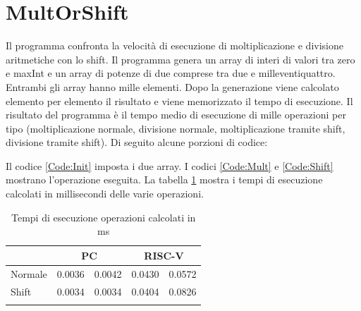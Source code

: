 \documentclass[12pt,a4paper]{report}
\begin{document}
\section{MultOrShift}
Il programma confronta la velocità di esecuzione di moltiplicazione e divisione aritmetiche con lo shift. Il programma genera un array di interi di valori tra zero e maxInt e un array di potenze di due comprese tra due e milleventiquattro. Entrambi gli array hanno mille elementi. Dopo la generazione viene calcolato elemento per elemento il risultato e viene memorizzato il tempo di esecuzione. Il risultato del programma è il tempo medio di esecuzione di mille operazioni per tipo (moltiplicazione normale, divisione normale, moltiplicazione tramite shift, divisione tramite shift). Di seguito alcune porzioni di codice:





Il codice \ref{Code:Init} imposta i due array.  I codici \ref{Code:Mult} e \ref{Code:Shift} mostrano l'operazione eseguita.
La tabella \ref{Tab:tempi_esecuzioneMS} mostra i tempi di esecuzione calcolati in millisecondi delle varie operazioni.

\begin{table}[ht]
\centering
\begin{tabular}{lcccc}
\cline{2-5}
\multicolumn{1}{l|}{}         & \multicolumn{2}{c|}{PC}                                   & \multicolumn{2}{c|}{RISC-V}                               \\ \hline
\multicolumn{1}{|l|}{Normale} & \multicolumn{1}{c|}{0.0036} & \multicolumn{1}{c|}{0.0042} & \multicolumn{1}{c|}{0.0430} & \multicolumn{1}{c|}{0.0572} \\ \hline
\multicolumn{1}{|l|}{Shift}   & \multicolumn{1}{c|}{0.0034} & \multicolumn{1}{c|}{0.0034} & \multicolumn{1}{c|}{0.0404} & \multicolumn{1}{c|}{0.0826} \\ \hline
                              & \multicolumn{1}{l}{}        & \multicolumn{1}{l}{}        & \multicolumn{1}{l}{}        & \multicolumn{1}{l}{}       
\end{tabular}
	\caption{Tempi di esecuzione operazioni calcolati in ms}
	\label{Tab:tempi_esecuzioneMS}
\end{table}
	
\end{document}
